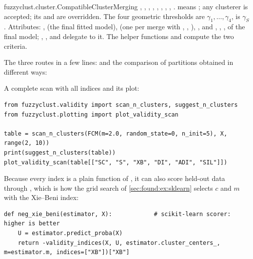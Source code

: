 \begin{apibox}{fuzzyclust.cluster.CompatibleClusterMerging}
, , , , , , , , .  means ; any  clusterer is accepted; its  and  are overridden. The four geometric thresholds are $\gamma_1,\dots,\gamma_4$,  is $\gamma_S$. Attributes: ,  (the final fitted model),  (one  per merge with , , ), , and , , ,  of the final model; , , and  delegate to it. The helper functions  and  compute the two criteria.
\end{apibox}

The three routes in a few lines:
and the comparison of partitions obtained in different ways:

A complete scan with all indices and its plot:
\begin{lstlisting}
from fuzzyclust.validity import scan_n_clusters, suggest_n_clusters
from fuzzyclust.plotting import plot_validity_scan

table = scan_n_clusters(FCM(m=2.0, random_state=0, n_init=5), X, range(2, 10))
print(suggest_n_clusters(table))
plot_validity_scan(table[["SC", "S", "XB", "DI", "ADI", "SIL"]])
\end{lstlisting}
Because every index is a plain function of , it can also score held-out data through , which is how the grid search of \cref{sec:found:ex:sklearn} selects $c$ and $m$ with the Xie--Beni index:
\begin{lstlisting}
def neg_xie_beni(estimator, X):            # scikit-learn scorer: higher is better
    U = estimator.predict_proba(X)
    return -validity_indices(X, U, estimator.cluster_centers_, m=estimator.m, indices=["XB"])["XB"]
\end{lstlisting}

